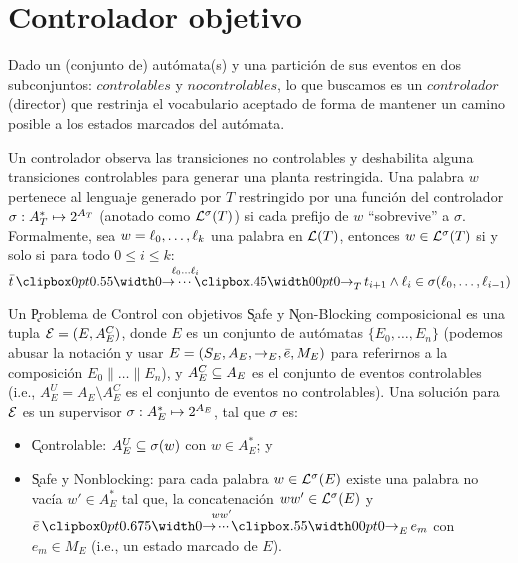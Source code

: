 \section{Controlador objetivo}

Dado un (conjunto de) autómata(s) y una partición de sus eventos en dos subconjuntos: $controlables$ y $no controlables$, lo que buscamos es un $controlador$ (director) que restrinja el vocabulario aceptado de forma de mantener un camino posible a los estados marcados del autómata.

Un controlador observa las transiciones no controlables y deshabilita alguna transiciones controlables para generar una planta restringida. Una palabra $w$ pertenece al lenguaje generado por $T$ restringido por una función del controlador $\sigma : A_T^* \mapsto 2^{A_T}$ (anotado como $\mathcal{L}^\sigma(T)$) si cada prefijo de $w$ ``sobrevive'' a $\sigma$.
Formalmente, sea $w = \ell_0,\ldots,\ell_k$ una palabra en $\mathcal{L}(T)$, entonces $w \in \mathcal{L}^\sigma(T)$ si y solo si para todo $0 \leq i \leq k$:
$
\init{t} \run{\,\l_0}{\l_i}{T} t_{i+1} \wedge \l_i \in \sigma(\l_0,\ldots,\l_{i-1})
$

\begin{definition} \label{def:control-problem}
	Un \k{Problema de Control} con objetivos \k{Safe} y \k{Non-Blocking} composicional es una tupla $\mathcal{E} = (E, A_E^C)$, donde $E$ es un conjunto de autómatas $\{E_0,\ldots,E_n\}$ (podemos abusar la notación y usar $E = (S_E,A_E,\rightarrow_E,\bar{e},M_E)$ para referirnos a la composición $E_0\|\ldots\|E_n$), y $A_E^C \subseteq A_E$ es el conjunto de eventos controlables (i.e., $A_E^U = A_E \setminus A_E^C$ es el conjunto de eventos no controlables).
	Una solución para $\mathcal{E}$ es un supervisor $\sigma : A_E^* \mapsto 2^{A_E}$, tal que $\sigma$ es:
	\begin{itemize}[itemsep=4pt,topsep=-8pt]
		
		\item \k{Controlable}: $A_E^U \subseteq \sigma(w)$ con $w \in A_E^*$; y
		
		\item \k{Safe y Nonblocking}: para cada palabra $w \in \mathcal{L}^\sigma(E)$ existe una palabra no vacía $w' \in A_E^*$ tal que, la concatenación $ww' \in \mathcal{L}^\sigma(E)$ y $\init{e} \runw{\;ww'}{E} e_m$ con $e_m \in M_E$ (i.e., un estado marcado de $E$).
		
	\end{itemize}
	
\end{definition}

